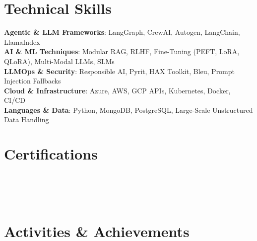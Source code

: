 \documentclass[a4paper,11pt]{article}
\begin{document}
\section{Technical Skills}
 \begin{itemize}[leftmargin=0.15in, label={}]
    \small{\item{
     \textbf{Agentic \& LLM Frameworks}{: LangGraph, CrewAI, Autogen, LangChain, LlamaIndex} \\
     \textbf{AI \& ML Techniques}{: Modular RAG, RLHF, Fine-Tuning (PEFT, LoRA, QLoRA), Multi-Modal LLMs, SLMs} \\
     \textbf{LLMOps \& Security}{: Responsible AI, Pyrit, HAX Toolkit, Bleu, Prompt Injection Fallbacks} \\
     \textbf{Cloud \& Infrastructure}{: Azure, AWS, GCP APIs, Kubernetes, Docker, CI/CD} \\
     \textbf{Languages \& Data}{: Python, MongoDB, PostgreSQL, Large-Scale Unstructured Data Handling}
    }}
 \end{itemize}

\section{Certifications}
 \begin{itemize}[leftmargin=0.15in, label={}]
    \small{\item{
      \\
      \\
      \\
    }}
 \end{itemize}

\section{Activities \& Achievements}
 \begin{itemize}[leftmargin=0.15in, label={}]
    \small{\item{
      \\
    }}
 \end{itemize}
\end{document}
